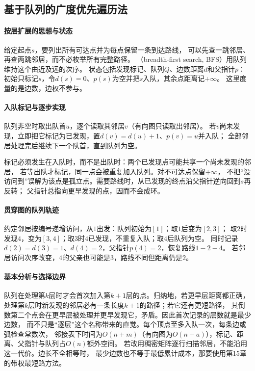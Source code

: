 \subsection{基于队列的广度优先遍历法}
\label{sec:graph-theory-bfs}

\paragraph{按层扩展的思想与状态}
给定起点$s$，要列出所有可达点并为每点保留一条到达路线，
可以先查一跳邻居、再查两跳邻居，而不必枚举所有完整路径。
（breadth-first search, BFS）用队列维持这个由近及远的次序。
状态包括发现标记、队列$Q$、边数距离$d$和父指针$p$：
初始只标记$s$，令$d(s)=0$、$p(s)$为空并把$s$入队，其余点距离记$+\infty$。
这里度量的是边数，边权不参与。

\paragraph{入队标记与逐步实现}
\begin{algorithm}[基于队列的广度优先遍历]
  队列非空时取出队首$u$，逐个读取其邻居$v$（有向图只读取出邻居）。
  若$v$尚未发现，立即把它标记为已发现，置$d(v)=d(u)+1$、$p(v)=u$并入队；
  全部邻居处理完后继续下一个队首，直到队列为空。
\end{algorithm}
标记必须发生在入队时，而不是出队时：两个已发现点可能共享一个尚未发现的邻居，
若等出队才标记，同一点会被重复加入队列。对不可达点保留$+\infty$，
不把“没访问到”误解为该点是孤立点。需要路线时，从已发现的终点沿父指针逆向回到$s$再反转；
父指针总指向更早发现的点，因而不会成环。

\paragraph{贯穿图的队列轨迹}
约定邻居按编号递增访问，从$1$出发：队列初始为$[1]$；取$1$后变为$[2,3]$；
取$2$时发现$4$，变为$[3,4]$；取$3$时$4$已发现，不重复入队；取$4$后队列为空。
同时记录$d(2)=d(3)=1$、$d(4)=2$，父指针$p(4)=2$，恢复路线$1-2-4$。
若邻居访问次序改变，$4$的父亲也可能是$3$，路线不同但距离仍是$2$。

\paragraph{基本分析与选择边界}
队列在处理第$k$层时才会首次加入第$k+1$层的点。归纳地，若更早层距离都正确，
处理第$k$层时新发现的邻居必有一条长度$k+1$的路径；若它还有更短路径，
其倒数第二个点会在更早层被处理并更早发现它，矛盾。因此首次记录的层数就是最少边数，
而不只是“逐层”这个名称带来的直觉。每个顶点至多入队一次，每条边或弧检查常数次，
邻接表下时间为$O(n+m)$（有向图为$O(n+a)$），标记、距离、父指针与队列占$O(n)$额外空间。
若改用稠密矩阵逐行扫描邻居，不能沿用这一代价。边长不全相等时，
最少边数也不等于最低累计成本，那要使用第15章的带权最短路方法。

